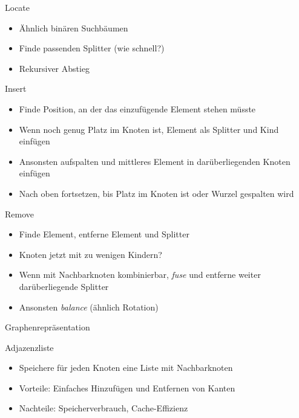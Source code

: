 \begin{frame}{Locate}
	\begin{itemize}
		\item Ähnlich binären Suchbäumen
		\item Finde passenden Splitter (wie schnell?)
		\item Rekursiver Abstieg
	\end{itemize}
\end{frame}

\begin{frame}{Insert}
	\begin{itemize}
		\item Finde Position, an der das einzufügende Element stehen müsste
		\item Wenn noch genug Platz im Knoten ist, Element als Splitter und Kind einfügen
		\item Ansonsten aufspalten und mittleres Element in darüberliegenden Knoten einfügen
		\item Nach oben fortsetzen, bis Platz im Knoten ist oder Wurzel gespalten wird
	\end{itemize}
\end{frame}

\begin{frame}{Remove}
	\begin{itemize}
		\item Finde Element, entferne Element und Splitter
		\item Knoten jetzt mit zu wenigen Kindern?
		\item Wenn mit Nachbarknoten kombinierbar, \emph{fuse} und entferne weiter darüberliegende Splitter
		\item Ansonsten \emph{balance} (ähnlich Rotation)
	\end{itemize}
\end{frame}

\begin{frame}
	\begin{center}
		\Huge
		Graphenrepräsentation
	\end{center}
\end{frame}

\begin{frame}{Adjazenzliste}
	\begin{itemize}
		\item Speichere für jeden Knoten eine Liste mit Nachbarknoten
		\item Vorteile: Einfaches Hinzufügen und Entfernen von Kanten
		\item Nachteile: Speicherverbrauch, Cache-Effizienz
	\end{itemize}
\end{frame}

